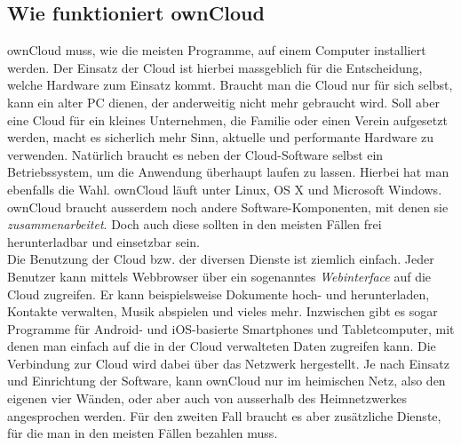 \subsection{Wie funktioniert ownCloud}
ownCloud muss, wie die meisten Programme, auf einem Computer installiert werden. Der Einsatz der Cloud ist hierbei massgeblich für die Entscheidung, welche Hardware zum Einsatz kommt. Braucht man die Cloud nur für sich selbst, kann ein alter PC dienen, der anderweitig nicht mehr gebraucht wird. Soll aber eine Cloud für ein kleines Unternehmen, die Familie oder einen Verein aufgesetzt werden, macht es sicherlich mehr Sinn, aktuelle und performante Hardware zu verwenden. Natürlich braucht es neben der Cloud-Software selbst ein Betriebssystem, um die Anwendung überhaupt laufen zu lassen. Hierbei hat man ebenfalls die Wahl. ownCloud läuft unter Linux, OS X und Microsoft Windows. ownCloud braucht ausserdem noch andere Software-Komponenten, mit denen sie \textit{zusammenarbeitet}. Doch auch diese sollten in den meisten Fällen frei herunterladbar und einsetzbar sein.
\\
Die Benutzung der Cloud bzw. der diversen Dienste ist ziemlich einfach. Jeder Benutzer kann mittels Webbrowser über ein sogenanntes \textit{Webinterface} auf die Cloud zugreifen. Er kann beispielsweise Dokumente hoch- und herunterladen, Kontakte verwalten, Musik abspielen und vieles mehr. Inzwischen gibt es sogar Programme für Android- und iOS-basierte Smartphones und Tabletcomputer, mit denen man einfach auf die in der Cloud verwalteten Daten zugreifen kann. Die Verbindung zur Cloud wird dabei über das Netzwerk hergestellt. Je nach Einsatz und Einrichtung der Software, kann ownCloud nur im heimischen Netz, also den eigenen vier Wänden, oder aber auch von ausserhalb des Heimnetzwerkes angesprochen werden. Für den zweiten Fall braucht es aber zusätzliche Dienste, für die man in den meisten Fällen bezahlen muss.

